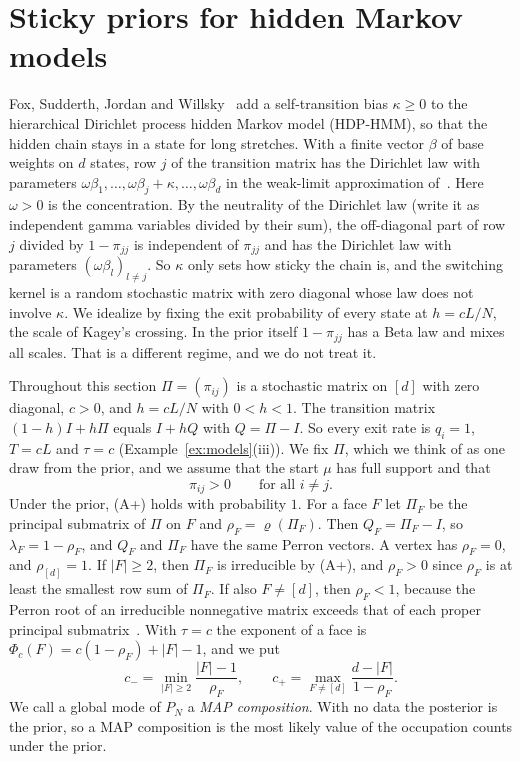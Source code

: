 \section{Sticky priors for hidden Markov models}\label{sec:sticky}

Fox, Sudderth, Jordan and Willsky~\cite{fox2011} add a self-transition bias
$\kappa\ge0$ to the hierarchical Dirichlet process hidden Markov model
(HDP-HMM), so that the hidden chain stays in a state for long stretches.
With a finite vector $\beta$ of base weights on $d$ states, row $j$ of the
transition matrix has the Dirichlet law with parameters
$\omega\beta_1,\dots,\omega\beta_j+\kappa,\dots,\omega\beta_d$ in the
weak-limit approximation of~\cite{fox2011}. Here $\omega>0$ is the
concentration. By the neutrality of the Dirichlet law (write it as independent gamma variables divided by
their sum), the off-diagonal part of row $j$ divided by $1-\pi_{jj}$ is
independent of $\pi_{jj}$ and has the Dirichlet law with parameters
$(\omega\beta_l)_{l\ne j}$. So $\kappa$ only sets how sticky the chain is,
and the switching kernel is a random stochastic matrix with zero diagonal
whose law does not involve $\kappa$. We idealize by fixing the exit
probability of every state at $h=cL/N$, the scale of Kagey's crossing. In
the prior itself $1-\pi_{jj}$ has a Beta law and mixes all scales. That is a
different regime, and we do not treat it.

Throughout this section $\Pi=(\pi_{ij})$ is a stochastic matrix on $[d]$
with zero diagonal, $c>0$, and $h=cL/N$ with $0<h<1$. The transition matrix
$(1-h)I+h\Pi$ equals $I+hQ$ with $Q=\Pi-I$. So every exit rate is $q_i=1$,
$T=cL$ and $\tau=c$ (Example~\ref{ex:models}(iii)). We fix $\Pi$, which we
think of as one draw from the prior, and we assume that the start $\mu$ has
full support and that
\[
 \pi_{ij}>0\qquad\text{for all } i\ne j. \tag{A+}
\]
Under the prior, (A+) holds with probability $1$. For a face $F$ let $\Pi_F$
be the principal submatrix of $\Pi$ on $F$ and $\rho_F=\varrho(\Pi_F)$. Then
$Q_F=\Pi_F-I$, so $\lambda_F=1-\rho_F$, and $Q_F$ and $\Pi_F$ have the same
Perron vectors. A vertex has $\rho_F=0$, and $\rho_{[d]}=1$. If
$\lvert F\rvert\ge2$, then $\Pi_F$ is irreducible by (A+), and $\rho_F>0$
since $\rho_F$ is at least the smallest row sum of $\Pi_F$. If also
$F\ne[d]$, then $\rho_F<1$, because the Perron root of an irreducible
nonnegative matrix exceeds that of each proper principal
submatrix~\cite{bermanplemmons1994}. With $\tau=c$ the exponent of a face is
$\Phi_c(F)=c(1-\rho_F)+\lvert F\rvert-1$, and we put
\[
 c_-=\min_{\lvert F\rvert\ge2}\frac{\lvert F\rvert-1}{\rho_F},\qquad
 c_+=\max_{F\ne[d]}\frac{d-\lvert F\rvert}{1-\rho_F}.
\]
We call a global mode of $P_N$ a \emph{MAP composition}. With no data the
posterior is the prior, so a MAP composition is the most likely value of the
occupation counts under the prior.

